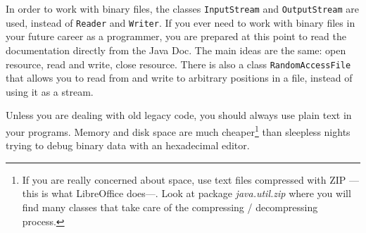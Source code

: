 In order to work with binary files, the classes \verb+InputStream+ and
\verb+OutputStream+ are used, instead of \verb+Reader+ and
\verb+Writer+. If you ever need to work with binary files in your
future career as a programmer, you are prepared at this point to read
the documentation directly from the Java Doc. The main ideas are the
same: open resource, read and write, close resource. There is also a
class \verb+RandomAccessFile+ that allows you to read from and write
to arbitrary positions in a file, instead of using it as a stream. 

Unless you are dealing with old legacy code, you should always use
plain text in your programs. Memory and disk space are much 
cheaper\footnote{If you are really concerned about space, use text
  files compressed with ZIP ---this is what LibreOffice does---. Look
  at package \emph{java.util.zip} where you will find many classes
  that take care of the compressing / decompressing process.} 
than sleepless nights trying to debug binary data with an
hexadecimal editor. 




